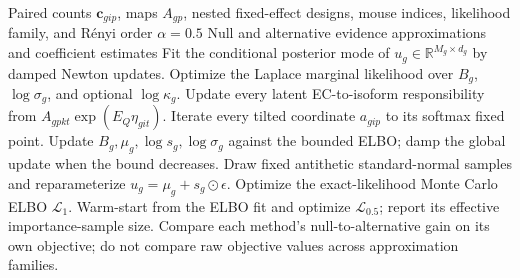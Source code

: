 \documentclass[11pt]{article}
\begin{document}
\begin{algorithm}[H]
\caption{Inference comparison for the paired EC-count GLMM}
\label{alg:ec-glmm}
\begin{algorithmic}[1]
\Require Paired counts \(\bm c_{gip}\), maps \(A_{gp}\), nested fixed-effect designs, mouse indices, likelihood family, and R\'enyi order \(\alpha=0.5\)
\Ensure Null and alternative evidence approximations and coefficient estimates
  \State Fit the conditional posterior mode of \(u_g\in\mathbb R^{M_g\times d_g}\) by damped Newton updates.
  \State Optimize the Laplace marginal likelihood over \(B_g\), \(\log\sigma_g\), and optional \(\log\kappa_g\).
    \Repeat
      \State Update every latent EC-to-isoform responsibility from \(A_{gpkt}\exp(E_Q\eta_{git})\).
      \State Iterate every tilted coordinate \(a_{gip}\) to its softmax fixed point.
      \State Update \(B_g,\mu_g,\log s_g,\log\sigma_g\) against the bounded ELBO; damp the global update when the bound decreases.
  \EndIf
  \State Draw fixed antithetic standard-normal samples and reparameterize \(u_g=\mu_g+s_g\mathbin\odot\epsilon\).
  \State Optimize the exact-likelihood Monte Carlo ELBO \(\mathcal L_1\).
  \State Warm-start from the ELBO fit and optimize \(\mathcal L_{0.5}\); report its effective importance-sample size.
\EndFor
\State Compare each method's null-to-alternative gain on its own objective; do not compare raw objective values across approximation families.
\end{algorithmic}
\end{algorithm}
\end{document}
